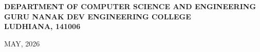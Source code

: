 \documentclass[12pt]{article}
\begin{document}
\begin{titlepage}
    \vspace{1.9cm}
    
    {\fontsize{14pt}{18pt}\selectfont \bfseries
    DEPARTMENT OF COMPUTER SCIENCE AND ENGINEERING\\
    GURU NANAK DEV ENGINEERING COLLEGE\\
    LUDHIANA, 141006 {\fontsize{12pt}{14pt}\selectfont } \par}
    
    \vspace{0.5cm}
    {\fontsize{12pt}{14pt}\selectfont MAY, 2026 \par}
    
\end{titlepage}
\end{document}
